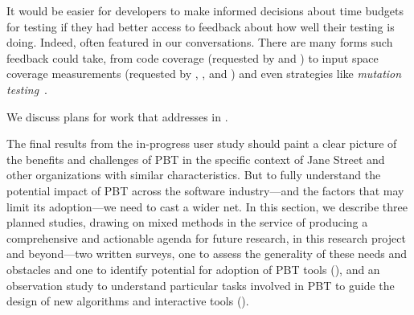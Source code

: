 It would be easier for developers to make informed decisions about
time budgets for testing if
they had better access to feedback about how well their testing is doing.
Indeed,  often featured in our
conversations.
There are many forms such feedback could take, from code coverage (requested by
 and ) to input space coverage measurements
(requested by , , and ) and even
strategies like {\em mutation
  testing}~\cite{papadakis_mutation_2018}.

We discuss plans for work that addresses  in .

\iflater
{}
\fi

\ifdesperateforspace
{}
  \fi



The final results from the in-progress user study should paint a clear
picture of the benefits and challenges of PBT in the specific context
of Jane Street and other organizations with similar characteristics.  But to
fully understand the potential impact of PBT across the software
industry---and the factors that may limit its adoption---we need to
cast a wider net.
%
In this section, we describe three planned studies, drawing on mixed
methods in the service of producing a comprehensive and actionable
agenda for future research, in this research project and beyond---two
written surveys, one to assess the generality of these needs and obstacles
and one to identify potential for adoption of PBT tools
(), and an observation study to understand
particular tasks involved in PBT to guide the design of new algorithms
and interactive tools ().

